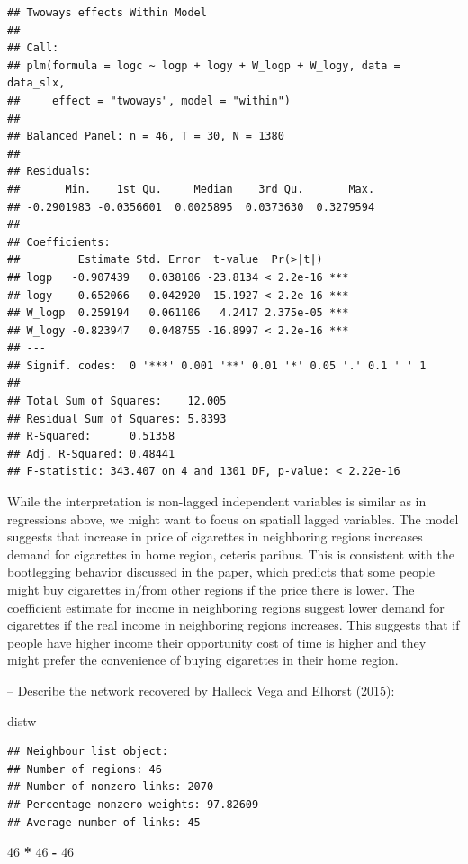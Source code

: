 \documentclass[
  a4paper,
]{article}
\newenvironment{Shaded}{\begin{snugshade}}{\end{snugshade}}
\newcommand{\DecValTok}[1]{\textcolor[rgb]{0.00,0.00,0.81}{#1}}
\newcommand{\NormalTok}[1]{#1}
\newcommand{\SpecialCharTok}[1]{\textcolor[rgb]{0.81,0.36,0.00}{\textbf{#1}}}
\begin{document}
\begin{verbatim}
## Twoways effects Within Model
## 
## Call:
## plm(formula = logc ~ logp + logy + W_logp + W_logy, data = data_slx, 
##     effect = "twoways", model = "within")
## 
## Balanced Panel: n = 46, T = 30, N = 1380
## 
## Residuals:
##       Min.    1st Qu.     Median    3rd Qu.       Max. 
## -0.2901983 -0.0356601  0.0025895  0.0373630  0.3279594 
## 
## Coefficients:
##         Estimate Std. Error  t-value  Pr(>|t|)    
## logp   -0.907439   0.038106 -23.8134 < 2.2e-16 ***
## logy    0.652066   0.042920  15.1927 < 2.2e-16 ***
## W_logp  0.259194   0.061106   4.2417 2.375e-05 ***
## W_logy -0.823947   0.048755 -16.8997 < 2.2e-16 ***
## ---
## Signif. codes:  0 '***' 0.001 '**' 0.01 '*' 0.05 '.' 0.1 ' ' 1
## 
## Total Sum of Squares:    12.005
## Residual Sum of Squares: 5.8393
## R-Squared:      0.51358
## Adj. R-Squared: 0.48441
## F-statistic: 343.407 on 4 and 1301 DF, p-value: < 2.22e-16
\end{verbatim}

While the interpretation is non-lagged independent variables is similar
as in regressions above, we might want to focus on spatiall lagged
variables. The model suggests that increase in price of cigarettes in
neighboring regions increases demand for cigarettes in home region,
ceteris paribus. This is consistent with the bootlegging behavior
discussed in the paper, which predicts that some people might buy
cigarettes in/from other regions if the price there is lower. The
coefficient estimate for income in neighboring regions suggest lower
demand for cigarettes if the real income in neighboring regions
increases. This suggests that if people have higher income their
opportunity cost of time is higher and they might prefer the convenience
of buying cigarettes in their home region.

-- Describe the network recovered by Halleck Vega and Elhorst (2015):

\begin{Shaded}
\begin{Highlighting}[]
\NormalTok{distw}
\end{Highlighting}
\end{Shaded}

\begin{verbatim}
## Neighbour list object:
## Number of regions: 46 
## Number of nonzero links: 2070 
## Percentage nonzero weights: 97.82609 
## Average number of links: 45
\end{verbatim}

\begin{Shaded}
\begin{Highlighting}[]
\DecValTok{46} \SpecialCharTok{*} \DecValTok{46} \SpecialCharTok{{-}} \DecValTok{46}
\end{Highlighting}
\end{Shaded}
\end{document}
